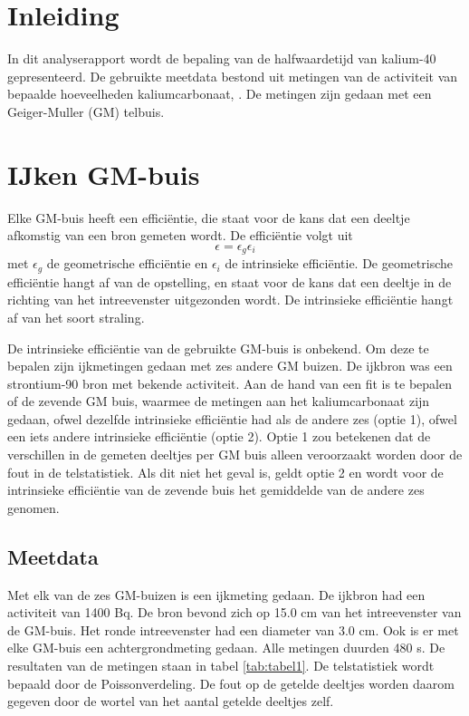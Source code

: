 \documentclass[11pt,a4paper]{article}
\begin{document}
\suppressfloats[t]      %


\section{Inleiding}
In dit analyserapport wordt de bepaling van de halfwaardetijd van kalium-40 gepresenteerd. De gebruikte meetdata bestond uit metingen van de activiteit van bepaalde hoeveelheden kaliumcarbonaat, . De metingen zijn gedaan met een Geiger-Muller (GM) telbuis.

\section{IJken GM-buis}

Elke GM-buis heeft een efficiëntie, die staat voor de kans dat een deeltje afkomstig van een bron gemeten wordt. De efficiëntie volgt uit
\begin{equation}
\epsilon = \epsilon_g \epsilon_i
\label{eq:efficientie}
\end{equation}
met $\epsilon_g$ de geometrische efficiëntie en $\epsilon_i$ de intrinsieke efficiëntie. De geometrische efficiëntie hangt af van de opstelling, en staat voor de kans dat een deeltje in de richting van het intreevenster uitgezonden wordt. De intrinsieke efficiëntie hangt af van het soort straling.

De intrinsieke efficiëntie van de gebruikte GM-buis is onbekend. Om deze te bepalen zijn ijkmetingen gedaan met zes andere GM buizen. De ijkbron was een strontium-90 bron met bekende activiteit. Aan de hand van een fit is te bepalen of de zevende GM buis, waarmee de metingen aan het kaliumcarbonaat zijn gedaan, ofwel dezelfde intrinsieke efficiëntie had als de andere zes (optie 1), ofwel een iets andere intrinsieke efficiëntie (optie 2). Optie 1 zou betekenen dat de verschillen in de gemeten deeltjes per GM buis alleen veroorzaakt worden door de fout in de telstatistiek. Als dit niet het geval is, geldt optie 2 en wordt voor de intrinsieke efficiëntie van de zevende buis het gemiddelde van de andere zes genomen.

\subsection{Meetdata}
Met elk van de zes GM-buizen is een ijkmeting gedaan. De ijkbron had een activiteit van 1400 Bq. De bron bevond zich op 15.0 cm van het intreevenster van de GM-buis. Het ronde intreevenster had een diameter van 3.0 cm. Ook is er met elke GM-buis een achtergrondmeting gedaan. Alle metingen duurden 480 s. De resultaten van de metingen staan in tabel \ref{tab:tabel1}. De telstatistiek wordt bepaald door de Poissonverdeling. De fout op de getelde deeltjes worden daarom gegeven door de wortel van het aantal getelde deeltjes zelf.
\end{document}
